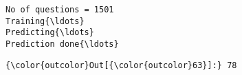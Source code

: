 \documentclass[11pt]{article}
\begin{document}
    \begin{Verbatim}[commandchars=\\\{\}]
No of questions = 1501
Training{\ldots}
Predicting{\ldots}
Prediction done{\ldots}

    \end{Verbatim}

\begin{Verbatim}[commandchars=\\\{\}]
{\color{outcolor}Out[{\color{outcolor}63}]:} 78
\end{Verbatim}
            

    
    
    
    
\end{document}
